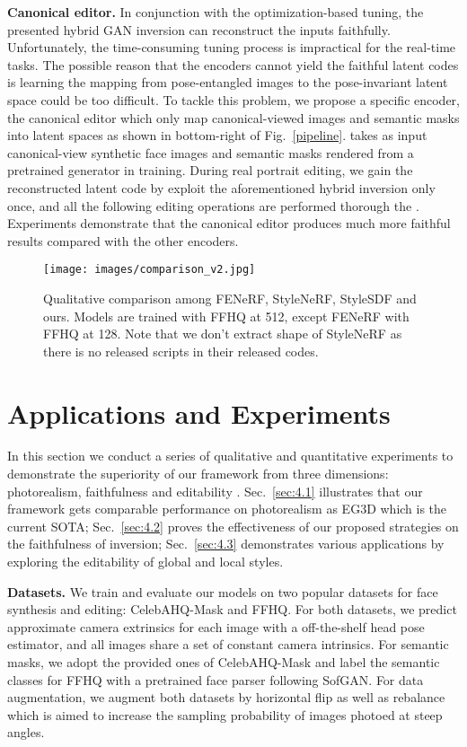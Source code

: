 \documentclass[acmtog]{acmart}
\begin{document}
\noindent \textbf{Canonical editor.} 
In conjunction with the optimization-based tuning, the presented hybrid GAN inversion can reconstruct the inputs faithfully. Unfortunately, the time-consuming tuning process is impractical for the real-time tasks. The possible reason that the encoders cannot yield the faithful latent codes is learning the mapping from pose-entangled images to the pose-invariant latent space could be too difficult. To tackle this problem, we propose a specific encoder, the canonical editor  which only map canonical-viewed images and semantic masks into latent spaces as shown in bottom-right of Fig.~\ref{pipeline}.  takes as input canonical-view synthetic face images and semantic masks rendered from a pretrained generator in training. During real portrait editing, we gain the reconstructed latent code by exploit the aforementioned hybrid inversion only once, and all the following editing operations are performed thorough the . Experiments demonstrate that the canonical editor produces much more faithful results compared with the other encoders.



\begin{figure}[t]
  \centering
  \texttt{[image: images/comparison\_v2.jpg]}
  \caption{Qualitative comparison among FENeRF, StyleNeRF, StyleSDF and ours. Models are trained with FFHQ at 512, except FENeRF with FFHQ at 128. Note that we don't extract shape of StyleNeRF as there is no released scripts in their released codes.}
  \Description{}
  \label{comparison}
\end{figure}


\section{Applications and Experiments}
In this section we conduct a series of qualitative and quantitative experiments to demonstrate the superiority of our framework from three dimensions: photorealism, faithfulness and editability \cite{xia2021gan}. Sec.~\ref{sec:4.1} illustrates that our framework gets comparable performance on photorealism as EG3D which is the current SOTA; Sec.~\ref{sec:4.2} proves the effectiveness of our proposed strategies on the faithfulness of inversion; Sec.~\ref{sec:4.3} demonstrates various applications by exploring the editability of global and local styles.

\noindent \textbf{Datasets.}  We train and evaluate our models on two popular datasets for face synthesis and editing: CelebAHQ-Mask\cite{CelebAMask-HQ} and FFHQ\cite{karras2019style}. For both datasets, we predict approximate camera extrinsics for each image with a off-the-shelf head pose estimator\cite{deng2019accurate}, and all images share a set of constant camera intrinsics. For semantic masks, we adopt the provided ones of CelebAHQ-Mask and label the semantic classes for FFHQ with a pretrained face parser following SofGAN. For data augmentation, we augment both datasets by horizontal flip as well as rebalance which is aimed to increase the sampling probability of images photoed at steep angles.
\end{document}
